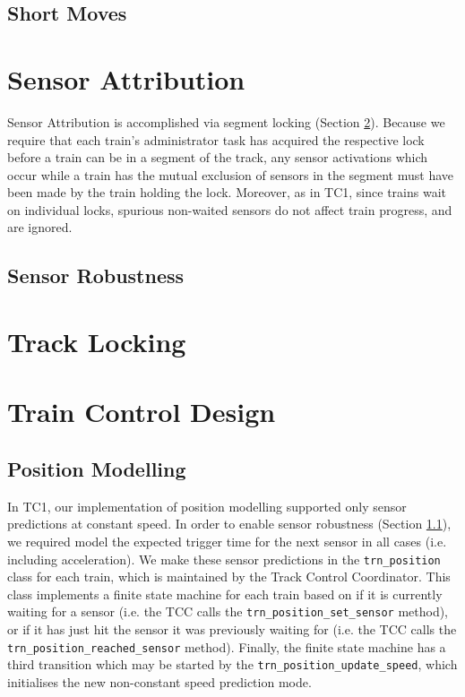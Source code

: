 \documentclass[12pt, titlepage]{article}
\begin{document}
    \subsection{Short Moves}
    \label{sec:short-moves}
    
    \section{Sensor Attribution}
    \label{sec:sensor-attribution}
    
    Sensor Attribution is accomplished via segment locking (Section \ref{sec:locking}). Because we require that each train's administrator task has acquired the respective lock before a train can be in a segment of the track, any sensor activations which occur while a train has the mutual exclusion of sensors in the segment must have been made by the train holding the lock. Moreover, as in TC1, since trains wait on individual locks, spurious non-waited sensors do not affect train progress, and are ignored.
    
    
    \subsection{Sensor Robustness}
    \label{sec:sensor-robustness}
    
    \section{Track Locking}
    \label{sec:locking}
    
    
    \section{Train Control Design}
    
    \subsection{Position Modelling}
    
    In TC1, our implementation of position modelling supported only sensor predictions at constant speed. In order to enable sensor robustness (Section \ref{sec:sensor-robustness}), we required model the expected trigger time for the next sensor in all cases (i.e. including acceleration). We make these sensor predictions in the \verb`trn_position` class for each train, which is maintained by the Track Control Coordinator. This class implements a finite state machine for each train based on if it is currently waiting for a sensor (i.e. the TCC calls the \verb`trn_position_set_sensor` method), or if it has just hit the sensor it was previously waiting for (i.e. the TCC calls the \verb`trn_position_reached_sensor` method). Finally, the finite state machine has a third transition which may be started by the \verb`trn_position_update_speed`, which initialises the new non-constant speed prediction mode.
    
\end{document}
